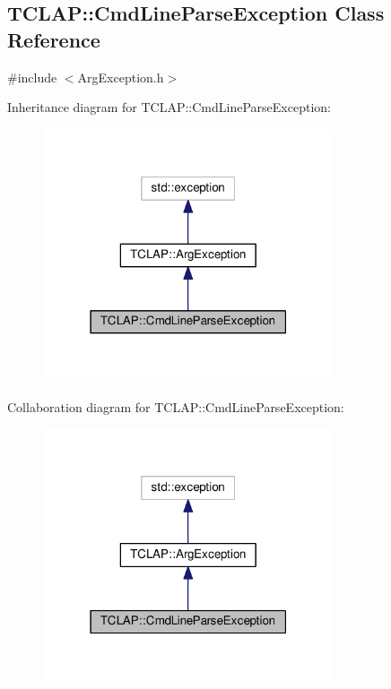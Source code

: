 \hypertarget{classTCLAP_1_1CmdLineParseException}{}\subsection{T\+C\+L\+AP\+:\+:Cmd\+Line\+Parse\+Exception Class Reference}
\label{classTCLAP_1_1CmdLineParseException}


{\ttfamily \#include $<$Arg\+Exception.\+h$>$}



Inheritance diagram for T\+C\+L\+AP\+:\+:Cmd\+Line\+Parse\+Exception\+:
\nopagebreak
\begin{figure}[H]
\begin{center}
\leavevmode
\includegraphics[width=243pt]{classTCLAP_1_1CmdLineParseException__inherit__graph}
\end{center}
\end{figure}


Collaboration diagram for T\+C\+L\+AP\+:\+:Cmd\+Line\+Parse\+Exception\+:
\nopagebreak
\begin{figure}[H]
\begin{center}
\leavevmode
\includegraphics[width=243pt]{classTCLAP_1_1CmdLineParseException__coll__graph}
\end{center}
\end{figure}
